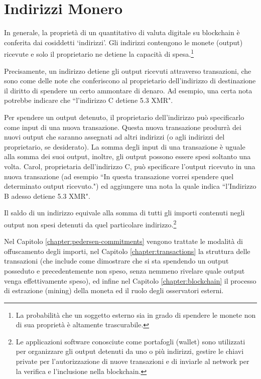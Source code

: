 \chapter{Indirizzi Monero}
\label{chapter:addresses}

In generale, la proprietà di un quantitativo di valuta digitale su blockchain è conferita dai cosiddetti `indirizzi'. Gli indirizzi contengono le monete (output) ricevute e solo il proprietario ne detiene la capacità di spesa.\footnote{La probabilità che un soggetto esterno sia in grado di spendere le monete non di sua proprietà è altamente trascurabile.}

Precisamente, un indirizzo detiene gli output ricevuti attraverso transazioni, che sono come delle note che conferiscono al proprietario dell'indirizzo di destinazione il diritto di spendere un certo ammontare di denaro. Ad esempio, una certa nota potrebbe indicare che ``l'indirizzo C detiene 5.3 XMR".

Per spendere un output detenuto, il proprietario dell'indirizzo può specificarlo come input di una nuova transazione. Questa nuova transazione produrrà dei nuovi output che saranno assegnati ad altri indirizzi (o agli indirizzi del proprietario, se desiderato). La somma degli input di una transazione è uguale alla somma dei suoi output, inoltre, gli output possono essere spesi soltanto una volta. Carol, proprietaria dell'indirizzo C, può specificare l'output ricevuto in una nuova transazione (ad esempio ``In questa transazione vorrei spendere quel determinato output ricevuto.") ed aggiungere una nota la quale indica ``l'Indirizzo B adesso detiene 5.3 XMR".

Il saldo di un indirizzo equivale alla somma di tutti gli importi contenuti negli output non spesi detenuti da quel particolare indirizzo.\footnote{Le applicazioni software conosciute come portafogli (wallet) sono utilizzati per organizzare gli output detenuti da uno o più indirizzi, gestire le chiavi private per l'autorizzazione di nuove transazioni e di inviarle al network per la verifica e l'inclusione nella blockchain.}

Nel Capitolo \ref{chapter:pedersen-commitments} vengono trattate le modalità di offuscamento degli importi, nel Capitolo \ref{chapter:transactions} la struttura delle transazioni (che include come dimostrare che si sta spendendo un output posseduto e precedentemente non speso, senza nemmeno rivelare quale output venga effettivamente speso), ed infine nel Capitolo \ref{chapter:blockchain} il processo di estrazione (mining) della moneta ed il ruolo degli osservatori esterni.



